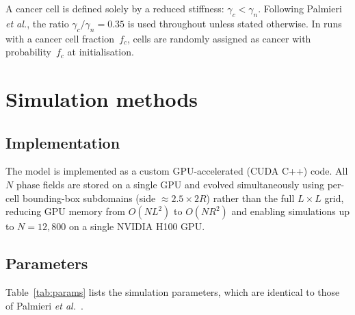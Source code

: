 \documentclass[aps,pre,twocolumn,superscriptaddress,longbibliography,floatfix]{revtex4-2}
\newcommand{\fc}{f_c}                      %
\begin{document}
A cancer cell is defined solely by a reduced stiffness: $\gamma_c <
\gamma_n$.  Following Palmieri \textit{et al.}, the ratio
$\gamma_c / \gamma_n = 0.35$ is used throughout unless stated
otherwise.  In runs with a cancer cell fraction~$\fc$, cells are
randomly assigned as cancer with probability~$\fc$ at initialisation.


\section{Simulation methods}
\label{sec:methods}

\subsection{Implementation}
\label{sec:methods:gpu}

The model is implemented as a custom GPU-accelerated (CUDA C++) code.
All $N$ phase fields are stored on a single GPU and evolved
simultaneously using per-cell bounding-box subdomains (side
$\approx 2.5 \times 2R$) rather than the full $L \times L$ grid,
reducing GPU memory from $O(NL^2)$ to $O(NR^2)$ and enabling
simulations up to $N = 12{,}800$ on a single NVIDIA H100 GPU.

\subsection{Parameters}
\label{sec:methods:params}

Table~\ref{tab:params} lists the simulation parameters, which are
identical to those of Palmieri
\textit{et al.}~\cite{Palmieri2015}.
\end{document}
